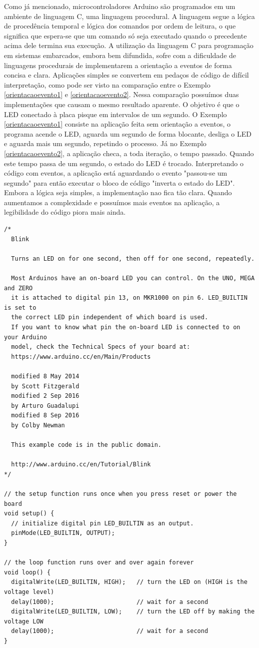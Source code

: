 \documentclass{article}
\begin{document}
\par Como já mencionado, microcontroladores Arduino são programados em um ambiente de linguagem C, uma linguagem procedural. A linguagem segue a lógica de procedência temporal e lógica dos comandos por ordem de leitura, o que significa que espera-se que um comando só seja executado quando o precedente acima dele termina sua execução. A utilização da linguagem C para programação em sistemas embarcados, embora bem difundida, sofre com a dificuldade de linguagens procedurais de implementarem a orientação a eventos de forma concisa e clara. Aplicações simples se convertem em pedaços de código de difícil interpretação, como pode ser visto na comparação entre o Exemplo \ref{orientacaoevento1} e \ref{orientacaoevento2}. Nessa comparação possuímos duas implementações que causam o mesmo resultado aparente. O objetivo é que o LED conectado à placa pisque em intervalos de um segundo. O Exemplo \ref{orientacaoevento1} consiste na aplicação feita sem orientação a eventos, o programa acende o LED, aguarda um segundo de forma blocante, desliga o LED e aguarda mais um segundo, repetindo o processo. Já no Exemplo \ref{orientacaoevento2}, a aplicação checa, a toda iteração, o tempo passado. Quando este tempo passa de um segundo, o estado do LED é trocado. Interpretando o código com eventos, a aplicação está aguardando o evento "passou-se um segundo" para então executar o bloco de código "inverta o estado do LED". Embora a lógica seja simples, a implementação nao fica tão clara. Quando aumentamos a complexidade e possuímos mais eventos na aplicação, a legibilidade do código piora mais ainda. 
\begin{lstlisting}[style=CStyle,label=orientacaoevento1,caption=Aplicação não orientada a evento]
/*
  Blink

  Turns an LED on for one second, then off for one second, repeatedly.

  Most Arduinos have an on-board LED you can control. On the UNO, MEGA and ZERO
  it is attached to digital pin 13, on MKR1000 on pin 6. LED_BUILTIN is set to
  the correct LED pin independent of which board is used.
  If you want to know what pin the on-board LED is connected to on your Arduino
  model, check the Technical Specs of your board at:
  https://www.arduino.cc/en/Main/Products

  modified 8 May 2014
  by Scott Fitzgerald
  modified 2 Sep 2016
  by Arturo Guadalupi
  modified 8 Sep 2016
  by Colby Newman

  This example code is in the public domain.

  http://www.arduino.cc/en/Tutorial/Blink
*/

// the setup function runs once when you press reset or power the board
void setup() {
  // initialize digital pin LED_BUILTIN as an output.
  pinMode(LED_BUILTIN, OUTPUT);
}

// the loop function runs over and over again forever
void loop() {
  digitalWrite(LED_BUILTIN, HIGH);   // turn the LED on (HIGH is the voltage level)
  delay(1000);                       // wait for a second
  digitalWrite(LED_BUILTIN, LOW);    // turn the LED off by making the voltage LOW
  delay(1000);                       // wait for a second
}
\end{lstlisting}
\end{document}
